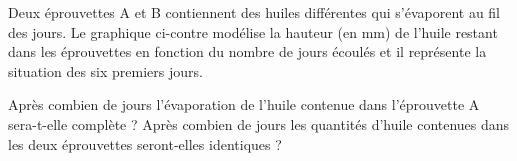 %
%
    \parbox[c]{.5\linewidth}{Deux éprouvettes A et B contiennent des huiles différentes qui s'évaporent au fil des jours.
        Le graphique ci-contre modélise la hauteur (en mm) de l'huile restant dans les éprouvettes en fonction du nombre de jours écoulés et il représente la situation des six premiers jours.}
    \hfil
    
    \begin{tasks}
        \task Après combien de jours l'évaporation de l'huile contenue dans l'éprouvette A sera-t-elle complète ?
        \task Après combien de jours les quantités d'huile contenues dans les deux éprouvettes seront-elles identiques ?
    \end{tasks}
